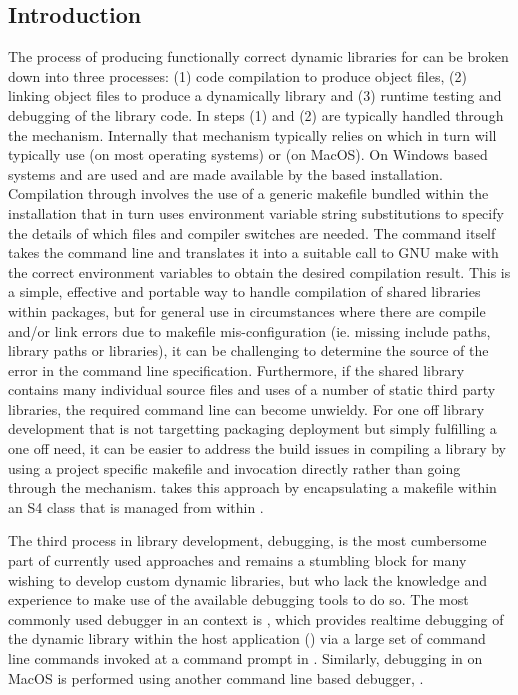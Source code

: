 \hypertarget{introduction}{%
\subsection{Introduction}\label{introduction}}
The process of producing functionally correct dynamic libraries for  can be broken down into three processes: (1) code compilation to produce object files,
(2) linking object files to produce a dynamically library and (3) runtime testing and debugging of the library code. In  steps (1) and (2) 
are typically handled through the \citep{SHLIB} mechanism. Internally that mechanism typically relies on \citep{GnuMake} which 
in turn will typically use \citep{gcc} (on most operating systems) or \citep{LLVM} (on MacOS). On Windows based systems  and 
are used and are made available by the  based  installation\citep{UsingRtools}. Compilation through  
involves the use of a generic makefile bundled within the  installation that in turn uses environment variable string substitutions to specify the details 
of which files and compiler switches are needed. The command itself takes the command line and translates it into a suitable call to GNU make with the correct 
environment variables to obtain the desired compilation result. This is a simple, effective and portable way to handle compilation of shared 
libraries within  packages, but for general use in circumstances where there are compile and/or link errors due to makefile mis-configuration 
(ie. missing include paths, library paths or libraries), it can be challenging to determine the source of the error in the command line specification. Furthermore, 
if the shared library contains many individual source files and uses of a number of static third party libraries, the required command line can become 
unwieldy. For one off library development that is not targetting packaging deployment but simply fulfilling a one off need, it can be easier to address the 
build issues in compiling a library by using a project specific makefile and  invocation directly rather than going through the  
mechanism.  takes this approach by encapsulating a makefile within an S4 class that is managed from within . 

The third process in library development, debugging, is the most cumbersome part of currently used approaches and remains a stumbling 
block for many wishing to develop custom dynamic libraries, but who lack the knowledge and experience to make use of the available debugging 
tools to do so. The most commonly used debugger in an  context is \citep{GDB}, which provides realtime debugging of the dynamic library within the
host application () via a large set of command line commands invoked at a command prompt in . Similarly, debugging in  on MacOS is performed using another 
command line based debugger, \citep{LLDB}. 

